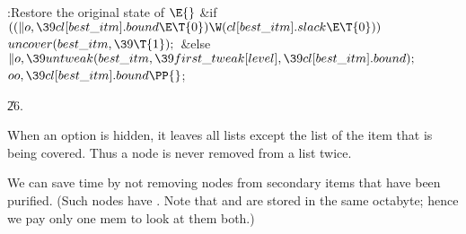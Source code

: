 \B{}:Restore the original state of \X${}\E{}$\6
\&{if} ${}((\|o,\39\\{cl}[\\{best\_itm}].\\{bound}\E\T{0})\W(\\{cl}[\\{best%
\_itm}].\\{slack}\E\T{0})){}$\1\5
${}\\{uncover}(\\{best\_itm},\39\T{1});{}$\2\6
\&{else}\1\5
${}\|o,\39\\{untweak}(\\{best\_itm},\39\\{first\_tweak}[\\{level}],\39\\{cl}[%
\\{best\_itm}].\\{bound});{}$\2\6
${}\\{oo},\39\\{cl}[\\{best\_itm}].\\{bound}\PP{}$;\par
\U26.\fi

When an option is hidden, it leaves all lists except the list of the
item that is being covered. Thus a node is never removed from a list
twice.

We can save time by not removing nodes from secondary items that have been
purified. (Such nodes have . Note that  and
 are
stored in the same octabyte; hence we pay only one mem to look at
them both.)

